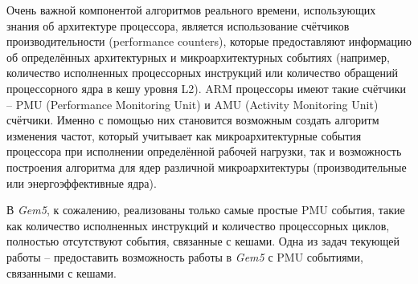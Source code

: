     Очень важной компонентой алгоритмов реального времени, использующих знания об архитектуре
    процессора, является использование счётчиков производительности (performance counters), которые
    предоставляют информацию об определённых архитектурных и микроархитектурных событиях
    (например, количество исполненных процессорных инструкций или количество обращений процессорного
    ядра в кешу уровня L2). ARM процессоры имеют такие счётчики -- PMU (Performance Monitoring Unit)
    и AMU (Activity Monitoring Unit) счётчики. Именно с помощью них становится возможным создать алгоритм
    изменения частот, который учитывает как микроархитектурные события процессора при исполнении
    определённой рабочей нагрузки, так и возможность построения алгоритма для ядер различной
    микроархитектуры (производительные или энергоэффективные ядра).

    В \textit{Gem5}, к сожалению, реализованы только самые простые PMU события, такие как количество
    исполненных инструкций и количество процессорных циклов, полностью отсутствуют события, связанные с
    кешами. Одна из задач текующей работы -- предоставить возможность работы в \textit{Gem5} с PMU
    событиями, связанными с кешами.

\newpage
